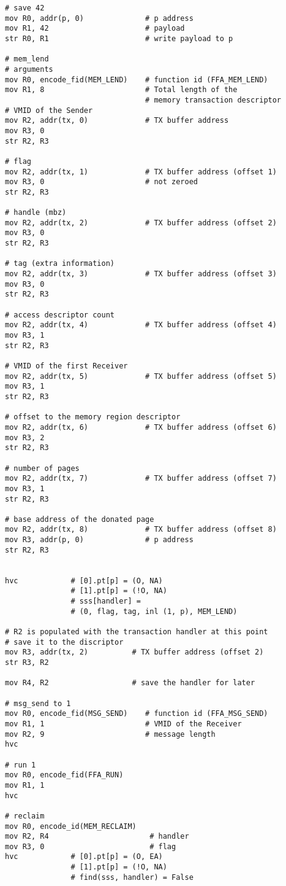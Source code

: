 \documentclass{article}
\begin{document}
\begin{lstlisting}[caption={VM 0}]
# save 42
mov R0, addr(p, 0)              # p address
mov R1, 42                      # payload
str R0, R1                      # write payload to p

# mem_lend
# arguments
mov R0, encode_fid(MEM_LEND)    # function id (FFA_MEM_LEND)
mov R1, 8                       # Total length of the
                                # memory transaction descriptor
# VMID of the Sender
mov R2, addr(tx, 0)             # TX buffer address
mov R3, 0
str R2, R3

# flag
mov R2, addr(tx, 1)             # TX buffer address (offset 1)
mov R3, 0                       # not zeroed
str R2, R3

# handle (mbz)
mov R2, addr(tx, 2)             # TX buffer address (offset 2)
mov R3, 0
str R2, R3

# tag (extra information)
mov R2, addr(tx, 3)             # TX buffer address (offset 3)
mov R3, 0
str R2, R3

# access descriptor count
mov R2, addr(tx, 4)             # TX buffer address (offset 4)
mov R3, 1
str R2, R3

# VMID of the first Receiver
mov R2, addr(tx, 5)             # TX buffer address (offset 5)
mov R3, 1
str R2, R3

# offset to the memory region descriptor
mov R2, addr(tx, 6)             # TX buffer address (offset 6)
mov R3, 2
str R2, R3

# number of pages
mov R2, addr(tx, 7)             # TX buffer address (offset 7)
mov R3, 1
str R2, R3

# base address of the donated page
mov R2, addr(tx, 8)             # TX buffer address (offset 8)
mov R3, addr(p, 0)              # p address
str R2, R3


hvc            # [0].pt[p] = (O, NA)
               # [1].pt[p] = (!O, NA)
               # sss[handler] =
               # (0, flag, tag, inl (1, p), MEM_LEND)

# R2 is populated with the transaction handler at this point
# save it to the discriptor
mov R3, addr(tx, 2)          # TX buffer address (offset 2)
str R3, R2

mov R4, R2                   # save the handler for later

# msg_send to 1
mov R0, encode_fid(MSG_SEND)    # function id (FFA_MSG_SEND)
mov R1, 1                       # VMID of the Receiver
mov R2, 9                       # message length
hvc

# run 1
mov R0, encode_fid(FFA_RUN)
mov R1, 1
hvc

# reclaim
mov R0, encode_id(MEM_RECLAIM)
mov R2, R4                       # handler
mov R3, 0                        # flag
hvc            # [0].pt[p] = (O, EA)
               # [1].pt[p] = (!O, NA)
               # find(sss, handler) = False
\end{lstlisting}
\end{document}
